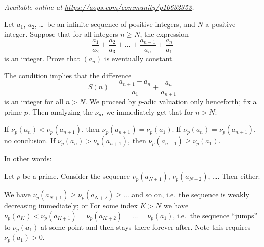 \textsl{Available online at \url{https://aops.com/community/p10632353}.}
\begin{mdframed}[style=mdpurplebox,frametitle={Problem statement}]
Let $a_1$, $a_2$, \dots\ be an infinite sequence of positive integers,
and $N$ a positive integer.
Suppose that for all integers $n \ge N$, the expression
\[ \frac{a_1}{a_2} + \frac{a_2}{a_3} + \dots
  + \frac{a_{n-1}}{a_n} + \frac{a_n}{a_1} \]
is an integer.
Prove that $(a_n)$ is eventually constant.
\end{mdframed}
The condition implies that the difference
\[ S(n) = \frac{a_{n+1} - a_n}{a_1} + \frac{a_n}{a_{n+1}} \]
is an integer for all $n > N$.
We proceed by $p$-adic valuation only henceforth;
fix a prime $p$.
Then analyzing the $\nu_p$, we immediately get that for $n > N$:
\begin{itemize}
\ii If $\nu_p(a_n) < \nu_p(a_{n+1})$, then $\nu_p(a_{n+1}) = \nu_p(a_1)$.
\ii If $\nu_p(a_n) = \nu_p(a_{n+1})$, no conclusion.
\ii If $\nu_p(a_n) > \nu_p(a_{n+1})$,
then $\nu_p(a_{n+1}) \ge \nu_p(a_1)$.
\end{itemize}
In other words:
\begin{claim*}
Let $p$ be a prime.  Consider the sequence
$\nu_p(a_{N+1})$, $\nu_p(a_{N+2})$, \dots.
Then either:
\begin{itemize}
  \ii We have $\nu_p(a_{N+1}) \ge \nu_p(a_{N+2}) \ge \dots$
  and so on, i.e.\ the sequence is weakly decreasing immediately; or
  \ii For some index $K > N$ we have
  $\nu_p(a_K) < \nu_p(a_{K+1}) = \nu_p(a_{K+2}) = \dots = \nu_p(a_1)$,
  i.e.\ the sequence ``jumps'' to $\nu_p(a_1)$
  at some point and then stays there forever after.
  Note this requires $\nu_p(a_1) > 0$.
\end{itemize}
\end{claim*}


